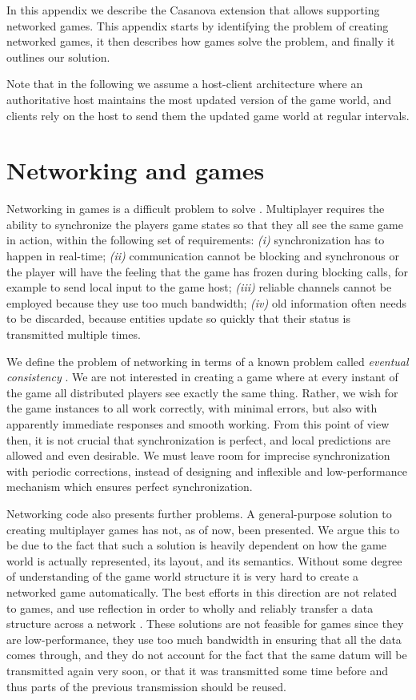 In this appendix we describe the Casanova extension that allows supporting networked games. This appendix starts by identifying the problem of creating networked games, it then describes how games solve the problem, and finally it outlines our solution.

Note that in the following we assume a host-client architecture where an authoritative host maintains the most updated version of the game world, and clients rely on the host to send them the updated game world at regular intervals.


\section{Networking and games}
Networking in games is a difficult problem to solve \cite{APPENDIX_B_NETWORKING_DIFFICULTIES}. Multiplayer requires the ability to synchronize the players game states so that they all see the same game in action, within the following set of requirements: \textit{(i)} synchronization has to happen in real-time; \textit{(ii)} communication cannot be blocking and synchronous or the player will have the feeling that the game has frozen during blocking calls, for example to send local input to the game host; \textit{(iii)} reliable channels cannot be employed because they use too much bandwidth; \textit{(iv)} old information often needs to be discarded, because entities update so quickly that their status is transmitted multiple times.

We define the problem of networking in terms of a known problem called \textit{eventual consistency} \cite{APPENDIX_B_EVENTUAL_CONSISTENCY}. We are not interested in creating a game where at every instant of the game all distributed players see exactly the same thing. 
Rather, we wish for the game instances to all work correctly, with minimal errors, but also with apparently immediate responses and smooth working. From this point of view then, it is not crucial that synchronization is perfect, and local predictions are allowed and even desirable. We must leave room for imprecise synchronization with periodic corrections, instead of designing and inflexible and low-performance mechanism which ensures perfect synchronization.

Networking code also presents further problems. A general-purpose solution to creating multiplayer games has not, as of now, been presented. We argue this to be due to the fact that such a solution is heavily dependent on how the game world is actually represented, its layout, and its semantics. Without some degree of understanding of the game world structure it is very hard to create a networked game automatically. The best efforts in this direction are not related to games, and use reflection in order to wholly and reliably transfer a data structure across a network \cite{APPENDIX_B_SERIALIZATION}. These solutions are not feasible for games since they are low-performance, they use too much bandwidth in ensuring that all the data comes through, and they do not account for the fact that the same datum will be transmitted again very soon, or that it was transmitted some time before and thus parts of the previous transmission should be reused.

